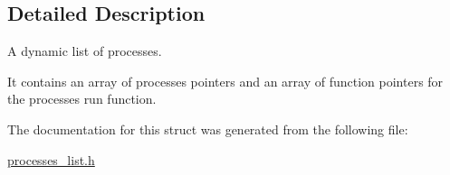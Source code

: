 \subsection{Detailed Description}
A dynamic list of processes. 

It contains an array of processes pointers and an array of function pointers for the processes run function. 

The documentation for this struct was generated from the following file\-:\begin{DoxyCompactItemize}
\item 
\hyperlink{processes__list_8h}{processes\-\_\-list.\-h}\end{DoxyCompactItemize}
